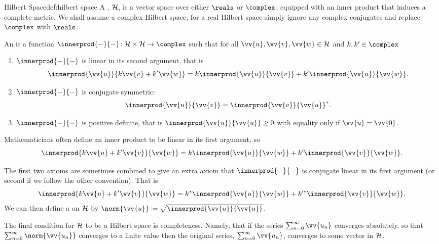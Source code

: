\begin{dfn}{Hilbert Space}{def:hilbert space}
    A , \(\mathcal{H}\), is a vector space over either \(\reals\) or \(\complex\), equipped with an inner product that induces a complete metric.
    We shall assume a complex Hilbert space, for a real Hilbert space simply ignore any complex conjugates and replace \(\complex\) with \(\reals\).
    
    An  is a function \(\innerprod{-}{-} \colon \hilbert \times \hilbert \to \complex\) such that for all \(\vv{u}, \vv{v}, \vv{w} \in \hilbert\) and \(k, k' \in \complex\)
    \begin{enumerate}
        \item \(\innerprod{-}{-}\) is linear in its second argument, that is
        \begin{equation}
            \innerprod{\vv{u}}{k\vv{v} + k'\vv{w}} = k\innerprod{\vv{u}}{\vv{v}} + k'\innerprod{\vv{u}}{\vv{w}}.
        \end{equation}
        \item \(\innerprod{-}{-}\) is conjugate symmetric:
        \begin{equation}
            \innerprod{\vv{u}}{\vv{v}} = \innerprod{\vv{v}}{\vv{u}}^*.
        \end{equation}
        \item \(\innerprod{-}{-}\) is positive definite, that is \(\innerprod{\vv{u}}{\vv{u}} \ge 0\) with equality only if \(\vv{u} = \vv{0}\).
    \end{enumerate}
    \begin{wrn}
        Mathematicians often define an inner product to be linear in its first argument, so
        \begin{equation}
            \innerprod{k\vv{u} + k'\vv{v}}{\vv{w}} = k\innerprod{\vv{u}}{\vv{w}} + k'\innerprod{\vv{v}}{\vv{w}}.
        \end{equation}
    \end{wrn}
    The first two axioms are sometimes combined to give an extra axiom that \(\innerprod{-}{-}\) is conjugate linear in its first argument (or second if we follow the other convention).
    That is
    \begin{equation}
        \innerprod{k\vv{u} + k'\vv{v}}{\vv{w}} = k^*\innerprod{\vv{u}}{\vv{w}} + k'^*\innerprod{\vv{v}}{\vv{w}}.
    \end{equation}
    We can then define a  on \(\mathcal{H}\) by \(\norm{\vv{u}} \coloneqq \sqrt{\innerprod{\vv{u}}{\vv{u}}}\).
    
    The final condition for \(\mathcal{H}\) to be a Hilbert space is completeness.
    Namely, that if the series \(\sum_{n=0}^{\infty} \vv{u_n}\) converges absolutely, so that \(\sum_{n=0}^{\infty} \norm{\vv{u_n}}\) converges to a finite value then the original series, \(\sum_{n=0}^{\infty} \vv{u_n}\), converges to some vector in \(\mathcal{H}\).
\end{dfn}

